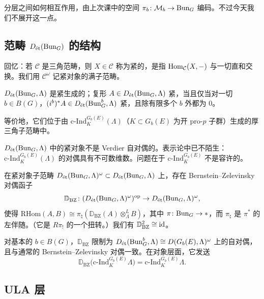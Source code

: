 \begin{remark}
分层之间如何相互作用，由上次课中的空间 $\pi_b\colon\mathcal{M}_b\to\Bun_G$ 编码。不过今天我们不展开这一点。
\end{remark}

\subsection{范畴 $D_{\et}(\Bun_G)$ 的结构}

回忆：若 $\mathcal{C}$ 是三角范畴，则 $X\in\mathcal{C}$ 称为紧的，是指 $\Hom_{\mathcal{C}}(X,-)$ 与一切直和交换。我们用 $\mathcal{C}^\omega$ 记紧对象的满子范畴。

\begin{theorem}
$D_{\et}(\Bun_G,\Lambda)$ 是紧生成的；复形 $A\in D_{\et}(\Bun_G,\Lambda)$ 紧，当且仅当对一切 $b\in B(G)$，$(i^b)^*A\in D_{\et}(\Bun^b_G,\Lambda)$ 紧，且除有限多个 $b$ 外都为 $0$。

等价地，它们位于由 $\mathrm{c}\text{-}\mathrm{Ind}^{G_b(E)}_K(\Lambda)$（$K\subset G_b(E)$ 为开 pro-$p$ 子群）生成的厚三角子范畴中。
\end{theorem}

\begin{warning}
$D_{\et}(\Bun_G,\Lambda)$ 中的紧对象不是 Verdier 自对偶的。表示论中已不陌生：$\mathrm{c}\text{-}\mathrm{Ind}^{G_b(E)}_K(\Lambda)$ 的对偶具有不可数维数。问题在于 $\mathrm{c}\text{-}\mathrm{Ind}^{G_b(E)}_K$ 不是容许的。
\end{warning}

\begin{theorem}
在紧对象子范畴 $D_{\et}(\Bun_G,\Lambda)^\omega\subset D_{\et}(\Bun_G,\Lambda)$ 上，存在 Bernstein--Zelevinsky 对偶函子
\[
\mathbb{D}_{\mathrm{BZ}}\colon(D_{\et}(\Bun_G,\Lambda)^\omega)^{\mathrm{op}}\to D_{\et}(\Bun_G,\Lambda)^\omega,
\]
使得 $\mathrm{RHom}(A,B)\cong\pi_\natural(\mathbb{D}_{\mathrm{BZ}}(A)\otimes^L_\Lambda B)$，其中 $\pi\colon\Bun_G\to*$，而 $\pi_\natural$ 是 $\pi^*$ 的左伴随。（它是 $R\pi_!$ 的一个扭转。）我们有 $\mathbb{D}_{\mathrm{BZ}}^2\cong\id$。

对基本的 $b\in B(G)$，$\mathbb{D}_{\mathrm{BZ}}$ 限制为 $D_{\et}(\Bun^b_G,\Lambda)\cong D(G_b(E),\Lambda)^\omega$ 上的自对偶，且与通常的 Bernstein--Zelevinsky 对偶一致。在对象层面，它发送
\[
\mathbb{D}_{\mathrm{BZ}}\bigl(\mathrm{c}\text{-}\mathrm{Ind}^{G_b(E)}_K\Lambda\bigr)=\mathrm{c}\text{-}\mathrm{Ind}^{G_b(E)}_K\Lambda.
\]
\end{theorem}

\subsection{ULA 层}

